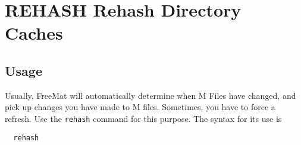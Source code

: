 \section{REHASH Rehash Directory Caches}

\subsection{Usage}

Usually, FreeMat will automatically determine when M Files have
changed, and pick up changes you have made to M files.  Sometimes,
you have to force a refresh.  Use the \verb|rehash| command for this
purpose.  The syntax for its use is 
\begin{verbatim}
  rehash
\end{verbatim}
